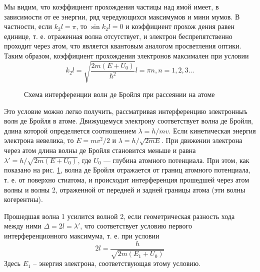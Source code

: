 \documentclass[12pt,a4paper]{article}
\begin{document}
Мы видим, что коэффициент прохождения частицы над ямой имеет, в зависимости от ее энергии, ряд чередующихся максимумов и мини­ мумов. В частности, если $k_2l = \pi$, то $\sin k_2l = 0$ и коэффициент прохож­ дения равен единице, т. е. отраженная волна отсутствует, и электрон беспрепятственно проходит через атом, что является квантовым анало­гом просветления оптики.
Таким образом, коэффициент прохождения электронов максимален при условии 
\begin{equation}
k_2l = \sqrt{\frac{2m(E+U_0)}{\hbar^2}}l = \pi n, n = 1, 2, 3...
\end{equation}

\begin{figure} \label{wave} 
\caption{Схема интерференции волн де Бройля при рассеянии на атоме}
\end{figure}
Это условие можно легко получить, рассматривая интерференцию электронныъ волн де Бройля в атоме. Движущемуся электрону соответствует волна де Бройля, длина которой определяется соотношением $\lambda  = h/mv$. Если кинетическая энергия электрона невелика, то $E = mv^2/2$ и $\lambda = h/\sqrt{2mE}$. При движении электрона через атом длина волны де Брой­ля становится меньше и равна $\lambda' = h/\sqrt{2m(E + U_0)}$, где $U_0$ — глуби­на атомного потенциала. При этом, как показано на рис. \ref{wave}, волна де Бройля отражается от границ атомного потенциала, т. е. от поверхно­ стиатома, и происходит интерференция прошедшей через атом волны и волны 2, отраженной от передней и задней границы атома (эти волны когерентны).

Прошедшая волна 1 усилится волной 2, если геометрическая раз­ность хода между ними $\Delta = 2l = \lambda'$, что соответствует условию первого интерференционного максимума, т. е. при условии
\begin{equation} \label{max}
2l = \frac{h}{\sqrt{2m(E_1 + U_0)}}
\end{equation}
Здесь $E_1$ -- энергия электрона, соответствующая этому условию.
\end{document}
